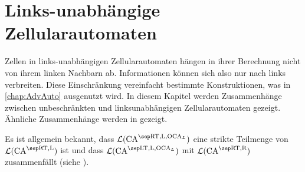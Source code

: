 \chapter{Links-unabhängige Zellularautomaten}
\label{chap:LinksunabhAuto}

Zellen in links-unabhängigen Zellularautomaten hängen in ihrer Berechnung nicht von ihrem linken Nachbarn ab.
Informationen können sich also nur nach links verbreiten. Diese Einschränkung vereinfacht bestimmte Konstruktionen, was in \cref{chap:AdvAuto} ausgenutzt wird.
In diesem Kapitel werden Zusammenhänge zwischen unbeschränkten und linksunabhängigen Zellularautomaten gezeigt.
Ähnliche Zusammenhänge werden in \cite{Choffrut1984} gezeigt.

Es ist allgemein bekannt,
dass $\CAL{\CART, \CALeft, \LOCA}$ eine strikte Teilmenge von $\CAL{\CART, \CALeft}$ ist und
dass $\CAL{\CALT, \CALeft, \LOCA}$ mit $\CAL{\CART, \CARight}$ zusammenfällt (siehe \cite{Kutrib2009}).

